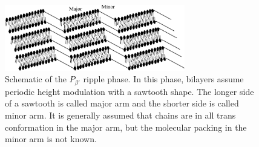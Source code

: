 \begin{figure}[htbp]
  \centering
  \includegraphics[width=0.7\textwidth]{figures/ripple_cartoon}
  \caption{Schematic of the $P_{\beta'}$ ripple phase. In this phase, 
  bilayers assume periodic height modulation with a sawtooth shape.
  The longer side of a sawtooth is called major arm and the shorter
  side is called minor arm. It is generally assumed that chains are
  in all trans conformation in the major arm, but the molecular packing
  in the minor arm is not known.}
  \label{fig:ripple_cartoon}
\end{figure}